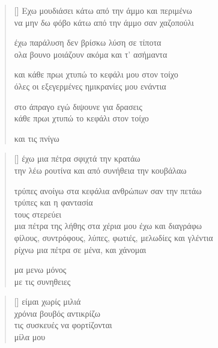 \documentclass[12pt]{article}
\begin{document}
\newpage

\settowidth{\versewidth}{έχω παράλυση δεν βρίσκω λύση σε τίποτα}
\begin{verse}[\versewidth]
  Εχω μουδιάσει κάτω από την άμμο και περιμένω \\
  να μην δω φόβο κάτω από την άμμο σαν χαζοπούλι

  έχω παράλυση δεν βρίσκω λύση σε τίποτα \\
  ολα βουνο μοιάζουν ακόμα και τ' ασήμαντα

  και κάθε πρωι χτυπώ το κεφάλι μου στον τοίχο \\
  όλες οι εξεγερμένες ημικρανίες μου ενάντια

  στο άπραγο εγώ διψουνε για δρασεις \\
  κάθε πρωι χτυπώ το κεφάλι στον τοίχο

  και τις πνίγω
\end{verse}

\newpage

\settowidth{\versewidth}{τρύπες ανοίγω στα κεφάλια ανθρώπων σαν την}
\begin{verse}[\versewidth]
  έχω μια πέτρα σφιχτά την κρατάω \\
  την λέω ρουτίνα και από συνήθεια
  την κουβάλαω

  τρύπες ανοίγω στα κεφάλια ανθρώπων σαν την πετάω \\
  τρύπες και η φαντασία \\
  τους στερεύει \\

  μια πέτρα της λήθης στα χέρια μου έχω και διαγράφω \\
  φίλους, συντρόφους, λύπες, φωτιές, μελωδίες και γλέντια \\
  ρίχνω μια πέτρα σε μένα, και χάνομαι

  μα μενω μόνος \\
  με τις συνηθειες \\
\end{verse}

\newpage

\settowidth{\versewidth}{χρόνια βουβός αντικρίζω}
\begin{verse}[\versewidth]
  είμαι χωρίς μιλιά \\
  χρόνια βουβός αντικρίζω \\
  τις συσκευές να φορτίζονται \textperiodcentered \\
  μίλα μου
\end{verse}
\end{document}

